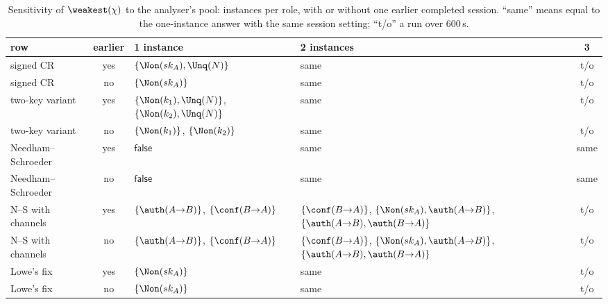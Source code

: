 \begin{table}[t]
\caption{Sensitivity of $\weakest(\chi)$ to the analyser's pool: instances per role,
with or without one earlier completed session. ``same'' means equal to the
one-instance answer with the same session setting; ``t/o'' a run over 600\,s.}
\label{tab:bound}
\centering
\setlength{\tabcolsep}{2pt}
\footnotesize
\begin{tabular}{l c p{2.9cm} p{3.3cm} c}
\toprule
row & earlier & 1 instance & 2 instances & 3\\
\midrule
signed CR & yes & $\{\Non(sk_A), \Unq(N)\}$ & same & t/o\\
signed CR & no & $\{\Non(sk_A)\}$ & same & t/o\\
two-key variant & yes & $\{\Non(k_1), \Unq(N)\}$, $\{\Non(k_2), \Unq(N)\}$ & same & t/o\\
two-key variant & no & $\{\Non(k_1)\}$, $\{\Non(k_2)\}$ & same & t/o\\
Needham--Schroeder & yes & $\mathsf{false}$ & same & same\\
Needham--Schroeder & no & $\mathsf{false}$ & same & same\\
N--S with channels & yes & $\{\auth(A{\to}B)\}$, $\{\conf(B{\to}A)\}$ & $\{\conf(B{\to}A)\}$, $\{\Non(sk_A), \auth(A{\to}B)\}$, $\{\auth(A{\to}B), \auth(B{\to}A)\}$ & t/o\\
N--S with channels & no & $\{\auth(A{\to}B)\}$, $\{\conf(B{\to}A)\}$ & $\{\conf(B{\to}A)\}$, $\{\Non(sk_A), \auth(A{\to}B)\}$, $\{\auth(A{\to}B), \auth(B{\to}A)\}$ & t/o\\
Lowe's fix & yes & $\{\Non(sk_A)\}$ & same & t/o\\
Lowe's fix & no & $\{\Non(sk_A)\}$ & same & t/o\\
\bottomrule
\end{tabular}
\end{table}
